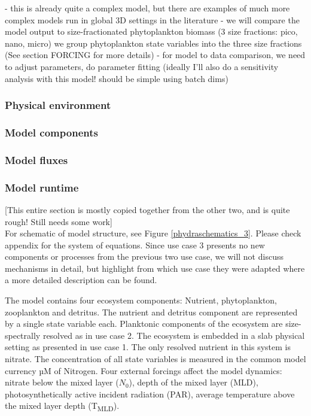 \documentclass[template.tex]{subfiles}
\begin{document}
- this is already quite a complex model, but there are examples of much more complex models run in global 3D settings in the literature \citep{Ward2012}
- we will compare the model output to size-fractionated phytoplankton biomass (3 size fractions: pico, nano, micro) we group phytoplankton state variables into the three size fractions (See section FORCING for more details)
- for model to data comparison, we need to adjust parameters, do parameter fitting (ideally I'll also do a sensitivity analysis with this model! should be simple using batch dims)

\subsubsection{Physical environment}
\subsubsection{Model components}

\subsubsection{Model fluxes}

\subsubsection{Model runtime}

[This entire section is mostly copied together from the other two, and is quite rough! Still needs some work]\\

For schematic of model structure, see Figure \ref{phydraschematics_3}. Please check appendix for the system of equations. 
Since use case 3 presents no new components or processes from the previous two use case, we will not discuss mechanisms in detail, but highlight from which use case they were adapted where a more detailed description can be found. 

The model contains four ecosystem components: Nutrient, phytoplankton, zooplankton and detritus. The nutrient and detritus component are represented by a single state variable each. Planktonic components of the ecosystem are size-spectrally resolved as in use case 2.
The ecosystem is embedded in a slab physical setting as presented in use case 1. The only resolved nutrient in this system is nitrate. The concentration of all state variables is measured in the common model currency \unit{µM} of Nitrogen. Four external forcings affect the model dynamics: nitrate below the mixed layer ($N_0$), depth of the mixed layer (MLD), photosynthetically active incident radiation (PAR), average temperature above the mixed layer depth (\unit{T_{MLD}}). 
\end{document}
